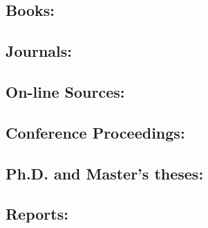 \documentclass{CML_Seminar_Template}
\begin{document}
\subsection*{Books:} 

\cite[]{Ham2002, MaVa1984}

\subsection*{Journals:}

\cite[]{Gro1995}

\subsection*{On-line Sources:} 

\cite[]{Bal1994}

\subsection*{Conference Proceedings:} 

\cite[]{GrPr2003}

\subsection*{Ph.D. and Master's theses:}

\cite[]{Dou1996}

\subsection*{Reports:} 

\cite[]{BeMa1993}


%


\end{document}
